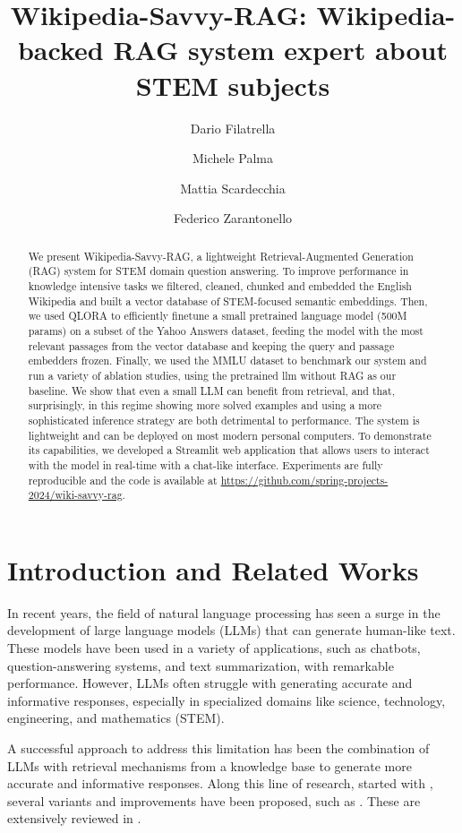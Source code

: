 \documentclass[11pt]{article}
\title{Wikipedia-Savvy-RAG: Wikipedia-backed RAG system expert about STEM subjects}
\author{Dario Filatrella \and Michele Palma \and Mattia Scardecchia \and Federico Zarantonello}
\begin{document}
\maketitle
\begin{abstract}
We present Wikipedia-Savvy-RAG, a lightweight Retrieval-Augmented Generation (RAG) system for
STEM domain question answering. To improve performance in knowledge intensive tasks we filtered, cleaned, 
chunked and embedded the English Wikipedia and built a vector database of STEM-focused semantic embeddings. 
Then, we used QLORA to efficiently finetune a small pretrained language model 
(500M params) on a subset of the Yahoo Answers dataset, feeding the model with the most relevant passages from the 
vector database and keeping the query and passage embedders frozen. Finally, we used the MMLU dataset to 
benchmark our system and run a variety of ablation studies, using the pretrained llm without RAG as our baseline.
We show that even a small LLM can benefit from retrieval, and that, surprisingly, in this regime showing more solved examples and using
a more sophisticated inference strategy are both detrimental to performance.
The system is lightweight and can be deployed on most modern personal computers. To demonstrate its capabilities,
we developed a Streamlit web application that allows users to interact with the model in real-time with a chat-like interface.
Experiments are fully reproducible and the code is available at \url{https://github.com/spring-projects-2024/wiki-savvy-rag}.

\end{abstract}

\section{Introduction and Related Works}

In recent years, the field of natural language processing has seen a surge in
the development of large language models (LLMs) that can generate human-like text. \cite{gpt3}
These models have been used in a variety of applications, such as chatbots,
question-answering systems, and text summarization, with remarkable performance.  \cite{nlp_applications}
However, LLMs often struggle with generating accurate and informative responses, especially in specialized
domains like science, technology, engineering, and mathematics (STEM).  \cite{hallucinations_llm}

A successful approach to address this limitation has been the combination of LLMs with retrieval
mechanisms from a knowledge base to generate more accurate and informative responses.
Along this line of research, started with \cite{rag_paper}, several variants and improvements have been proposed,
such as \cite{replug} \cite{radit}. These are extensively reviewed in \cite{rag_survey}.
\end{document}
